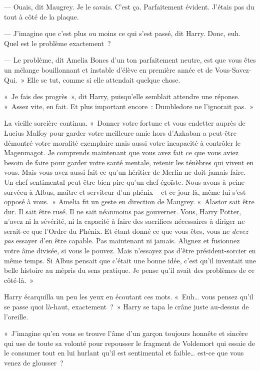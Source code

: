 --- Ouais, dit Maugrey. Je le savais. C'est ça. Parfaitement évident. J'étais pas du tout à côté de la plaque.

--- J'imagine que c'est plus ou moins ce qui s'est passé, dit Harry. Donc, euh. Quel est le problème exactement~?

--- Le problème, dit Amelia Bones d'un ton parfaitement neutre, est que vous êtes un mélange bouillonnant et instable d'élève en première année et de Vous-Savez-Qui.~» Elle se tut, comme si elle attendait quelque chose.

«~Je fais des progrès~», dit Harry, puisqu'elle semblait attendre une réponse. «~Assez vite, en fait. Et plus important encore~: Dumbledore ne l'ignorait pas.~»

La vieille sorcière continua. «~Donner votre fortune et vous endetter auprès de Lucius Malfoy pour garder votre meilleure amie hors d'Azkaban a peut-être démontré votre moralité exemplaire mais aussi votre incapacité à contrôler le Magenmagot. Je comprends maintenant que vous avez fait ce que vous aviez besoin de faire pour garder votre santé mentale, retenir les ténèbres qui vivent en vous. Mais vous avez aussi fait ce qu'un héritier de Merlin ne doit jamais faire. Un chef sentimental peut être bien pire qu'un chef égoïste. Nous avons à peine survécu à Albus, maître et serviteur d'un phénix -- et ce jour-là, même lui s'est opposé à vous.~» Amelia fit un geste en direction de Maugrey. «~Alastor sait être dur. Il sait être rusé. Il ne sait néanmoins pas gouverner. Vous, Harry Potter, n'avez ni la sévérité, ni la capacité à faire des sacrifices nécessaires à diriger ne serait-ce que l'Ordre du Phénix. Et étant donné ce que vous êtes, vous ne \emph{devez pas} essayer d'en être capable. Pas maintenant ni jamais. Alignez et fusionnez votre âme divisée, si vous le pouvez. Mais n'essayez pas d'être président-sorcier en même temps. Si Albus pensait que c'était une bonne idée, c'est qu'il inventait une belle histoire au mépris du sens pratique. Je pense qu'il avait des problèmes de ce côté-là.~»

Harry écarquilla un peu les yeux en écoutant ces mots. «~Euh… vous pensez qu'il se passe quoi là-haut, exactement~?~» Harry se tapa le crâne juste au-dessus de l'oreille.

«~J'imagine qu'en vous se trouve l'âme d'un garçon toujours honnête et sincère qui use de toute sa volonté pour repousser le fragment de Voldemort qui essaie de le consumer tout en lui hurlant qu'il est sentimental et faible… est-ce que vous venez de glousser~?

